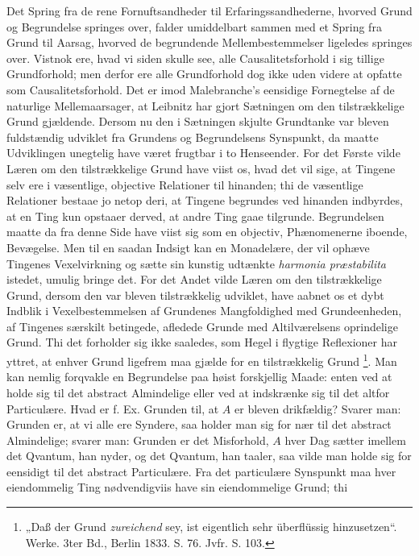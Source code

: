 \documentclass[11pt]{book}
\newcommand{\opage}[1]{\marginnote{\footnotesize\textit{[#1]}}}
\begin{document}
Det Spring fra de rene Fornuftsandheder til Erfaringssandhederne,
hvorved Grund og Begrundelse springes over, falder umiddelbart
sammen med et Spring fra Grund til Aarsag, hvorved de begrundende
Mellembestemmelser ligeledes springes over. Vistnok ere, hvad vi
siden skulle see, alle Causalitetsforhold i sig tillige
Grundforhold; men derfor ere alle Grundforhold dog ikke uden videre
at opfatte som Causalitetsforhold. Det er imod Malebranche's
eensidige Fornegtelse af de naturlige Mellemaarsager, at Leibnitz
har gjort Sætningen om den tilstrækkelige Grund gjældende. Dersom
nu den i Sætningen skjulte Grundtanke var bleven fuldstændig
udviklet fra Grundens og Begrundelsens Synspunkt, da maatte
Udviklingen unegtelig have været frugtbar i to Henseender. For det
Første vilde Læren om den tilstrækkelige
\opage{102} \setcounter{footnote}{0}%
Grund have viist os, hvad det vil sige, at Tingene selv ere i
væsentlige, objective Relationer til hinanden; thi de væsentlige
Relationer bestaae jo netop deri, at Tingene begrundes ved hinanden
indbyrdes, at en Ting kun opstaaer derved, at andre Ting gaae
tilgrunde. Begrundelsen maatte da fra denne Side have viist sig som
en objectiv, Phænomenerne iboende, Bevægelse. Men til en saadan
Indsigt kan en Monadelære, der vil ophæve Tingenes Vexelvirkning og
sætte sin kunstig udtænkte \textit{harmonia præstabilita} istedet,
umulig bringe det. For det Andet vilde Læren om den tilstrækkelige
Grund, dersom den var bleven tilstrækkelig udviklet, have aabnet os
et dybt Indblik i Vexelbestemmelsen af Grundenes Mangfoldighed med
Grundeenheden, af Tingenes særskilt betingede, afledede Grunde med
Altilværelsens oprindelige Grund. Thi det forholder sig ikke
saaledes, som Hegel i flygtige Reflexioner har yttret, at enhver
Grund ligefrem maa gjælde for en tilstrækkelig Grund%
\footnote{„Daß der Grund \emph{zureichend} sey, ist eigentlich sehr
überflüssig hinzusetzen“. Werke. 3ter Bd., Berlin 1833. S. 76.
Jvfr. S. 103.}. Man kan nemlig forqvakle en Begrundelse paa høist
forskjellig Maade: enten ved at holde sig til det abstract
Almindelige eller ved at indskrænke sig til det altfor Particulære.
Hvad er f. Ex. Grunden til, at $A$ er bleven drikfældig? Svarer
man: Grunden er, at vi alle ere Syndere, saa holder man sig for nær
til det abstract Almindelige; svarer man: Grunden er det
Misforhold, $A$ hver Dag sætter imellem det Qvantum, han nyder, og
det Qvantum, han taaler, saa vilde man holde sig for eensidigt til
det abstract Particulære. Fra det particulære Synspunkt maa hver
eiendommelig Ting nødvendigviis have sin eiendommelige Grund; thi
\end{document}
